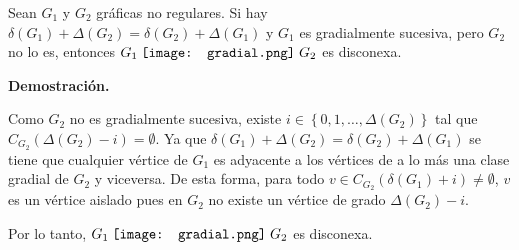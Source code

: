 \documentclass[fleqn, 11pt]{beamer}
\newcommand{\gradial}{\hspace{0.9mm} \texttt{[image: gradial.png]} \hspace{1mm}}
\begin{document}
    \begin{proposicion}{}{}
        Sean $ G_1 $ y $ G_2 $ gráficas no regulares. Si hay $ \delta(G_1) + \Delta(G_2) = \delta(G_2) + \Delta(G_1) $ y $ G_1 $ es gradialmente sucesiva, pero $ G_2 $ no lo es, entonces $ G_1 \gradial G_2 $ es disconexa.

        \tcblower

        \textbf{Demostración.} \vspace{3mm}

        Como $ G_2 $ no es gradialmente sucesiva, existe $ i \in \left\lbrace 0, 1, \ldots, \Delta(G_2) \right\rbrace $ tal que $ C_{G_2}(\Delta(G_2) - i) = \emptyset $. Ya que $ \delta(G_1) + \Delta(G_2) = \delta(G_2) + \Delta(G_1) $ se tiene que cualquier vértice de $ G_1 $ es adyacente a los vértices de a lo más una clase gradial de $ G_2 $ y viceversa. De esta forma, para todo $ v \in C_{G_2}(\delta(G_1) + i) \neq \emptyset $, $ v $ es un vértice aislado pues en $ G_2 $ no existe un vértice de grado $ \Delta(G_2) - i $. \vspace{2mm}

        Por lo tanto, $ G_1 \gradial G_2 $ es disconexa.
    \end{proposicion}
    
\end{document}
